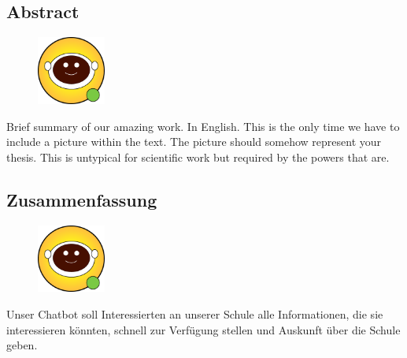 \begin{spacing}{1}
    \chapter*{Abstract}
\end{spacing}
\begin{figure}
    \begin{center}
      \includegraphics[width=0.2\textwidth]{pics/leon.png}
    \end{center}
\end{figure}
Brief summary of our amazing work. In English.
This is the only time we have to include a picture within the text.
The picture should somehow represent your thesis.
This is untypical for scientific work but required by the powers that are.
\lipsum[6]
\newpage
\begin{spacing}{1}
    \chapter*{Zusammenfassung}
\end{spacing}
\begin{figure}
    \begin{center}
      \includegraphics[width=0.2\textwidth]{pics/leon.png}
    \end{center}
\end{figure}
Unser Chatbot soll Interessierten an unserer Schule alle Informationen, die sie interessieren könnten, schnell zur Verfügung stellen und Auskunft über die Schule geben.
